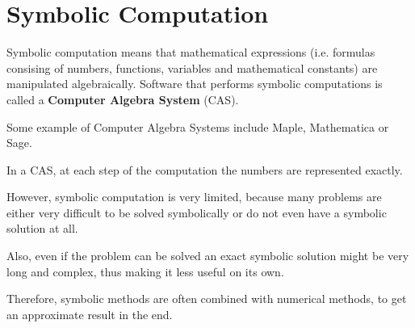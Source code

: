 \section{Symbolic Computation}
Symbolic computation means that mathematical expressions (i.e. formulas consising of numbers, functions, variables and mathematical constants) are manipulated algebraically.
Software that performs symbolic computations is called a \textbf{Computer Algebra System} (CAS).

Some example of Computer Algebra Systems include Maple, Mathematica or Sage.

In a CAS, at each step of the computation the numbers are represented exactly.

However, symbolic computation is very limited, because many problems are either 
very difficult to be solved symbolically or do not even have a symbolic solution at all. 

Also, even if the problem can be solved an exact symbolic solution might be very long and complex, 
thus making it less useful on its own. 

Therefore, symbolic methods are often combined with numerical methods, 
to get an approximate result in the end.
